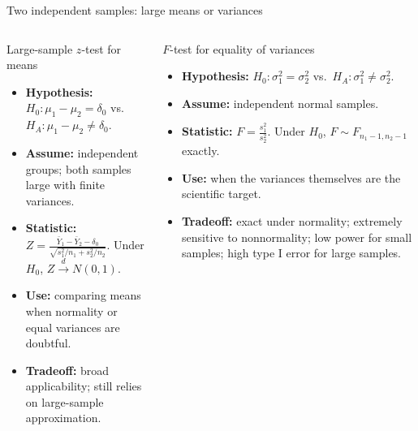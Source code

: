 \documentclass[aspectratio=169,11pt]{beamer}
\begin{document}
\begin{frame}{Two independent samples: large means or variances}
  \footnotesize
  \begin{columns}[T,onlytextwidth]
      \begin{block}{Large-sample \(z\)-test for means}
        \begin{itemize}
          \item \textbf{Hypothesis:} \(H_0:\mu_1-\mu_2=\delta_0\) vs.\ \(H_A:\mu_1-\mu_2\ne\delta_0\).
          \item \textbf{Assume:} independent groups; both samples large with finite variances.
          \item \textbf{Statistic:} \(\displaystyle Z=\frac{\bar Y_1-\bar Y_2-\delta_0}{\sqrt{s_1^2/n_1+s_2^2/n_2}}\). Under \(H_0\), \(Z\xrightarrow{d}N(0,1)\).
          \item \textbf{Use:} comparing means when normality or equal variances are doubtful.
          \item \textbf{Tradeoff:} broad applicability; still relies on large-sample approximation.
        \end{itemize}
      \end{block}
      \begin{block}{\(F\)-test for equality of variances}
        \begin{itemize}
          \item \textbf{Hypothesis:} \(H_0:\sigma_1^2=\sigma_2^2\) vs.\ \(H_A:\sigma_1^2\ne\sigma_2^2\).
          \item \textbf{Assume:} independent normal samples.
          \item \textbf{Statistic:} \(\displaystyle F=\frac{s_1^2}{s_2^2}\). Under \(H_0\), \(F\sim F_{n_1-1,n_2-1}\) exactly.
          \item \textbf{Use:} when the variances themselves are the scientific target.
          \item \textbf{Tradeoff:} exact under normality; extremely sensitive to nonnormality;
                                   low power for small samples; high type I error for large samples.
        \end{itemize}
      \end{block}
  \end{columns}
\end{frame}
\end{document}
